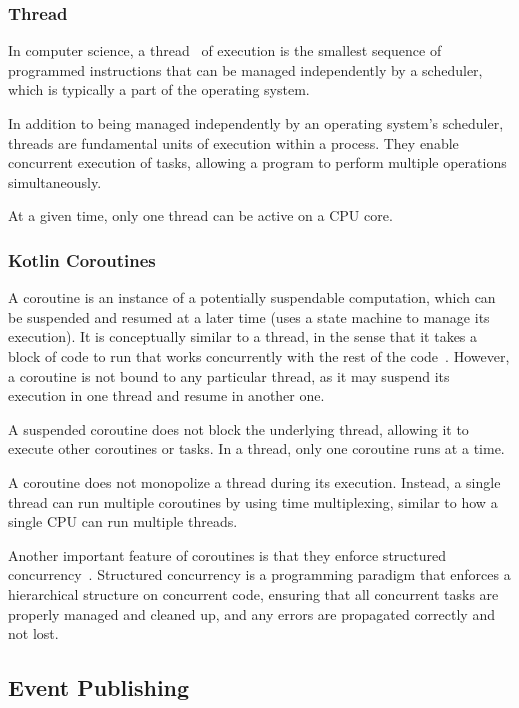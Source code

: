 \subsubsection{Thread}\label{subsubsec:thread}

In computer science, a thread~\cite{java-thread} of execution is the smallest sequence of programmed instructions that can be managed independently by a scheduler, which is typically a part of the operating system.

In addition to being managed independently by an operating system's scheduler, threads are fundamental units of execution within a process.
They enable concurrent execution of tasks, allowing a program to perform multiple operations simultaneously.

At a given time, only one thread can be active on a CPU core.

\subsubsection{Kotlin Coroutines}\label{subsubsec:kotlin-coroutines}

A coroutine is an instance of a potentially suspendable computation,
which can be suspended and resumed at a later time (uses a state machine to manage its execution).
It is conceptually similar to a thread,
in the sense that it takes a block of code
to run that works concurrently with the rest of the code~\cite{kotlin-coroutines}.
However, a coroutine is not bound to any particular thread,
as it may suspend its execution in one thread and resume in another one.

A suspended coroutine does not block the underlying thread, allowing it to execute other coroutines or tasks.
In a thread, only one coroutine runs at a time.

A coroutine does not monopolize a thread during its execution.
Instead, a single thread can run multiple coroutines by using time multiplexing,
similar to how a single CPU can run multiple threads.

Another important feature of coroutines is that they enforce structured concurrency~\cite{kotlin-coroutines}.
Structured concurrency is a programming paradigm that enforces a hierarchical structure on concurrent code, ensuring that all concurrent tasks are properly managed and cleaned up, and any errors are propagated correctly and not lost.

\subsection{Event Publishing}\label{subsec:event-publishing}

